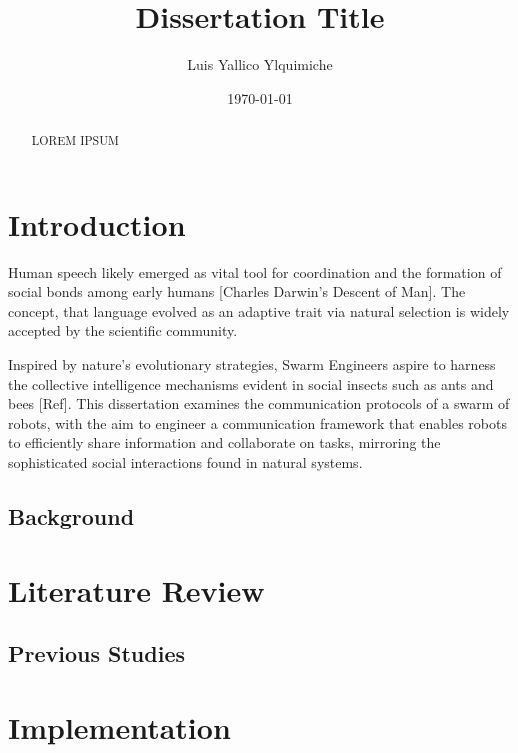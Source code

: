 \documentclass[conference]{IEEEtran}
\title{Dissertation Title}
\author{Luis Yallico Ylquimiche}
\date{\today}
\begin{document}
\maketitle

\begin{abstract}
LOREM IPSUM
\end{abstract}

\tableofcontents

\chapter{Introduction}
Human speech likely emerged as vital tool for coordination and the formation of social bonds among early humans [Charles Darwin's Descent of Man]. The concept, that language evolved as an adaptive trait via natural selection is widely accepted by the scientific community. 

Inspired by nature's evolutionary strategies, Swarm Engineers aspire to harness the collective intelligence mechanisms evident in social insects such as ants and bees [Ref]. This dissertation examines the communication protocols of a swarm of robots, with the aim to engineer a communication framework that enables robots to efficiently share information and collaborate on tasks, mirroring the sophisticated social interactions found in natural systems.


\section{Background}
\lipsum[1-2] %

\chapter{Literature Review}
\section{Previous Studies}
\lipsum[3-4] %

\chapter{Implementation}
\end{document}
